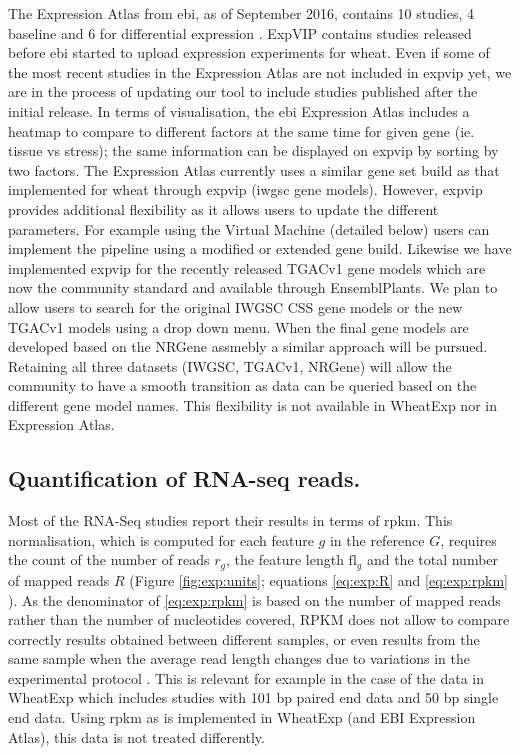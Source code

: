 The Expression Atlas from \gls{ebi}, as of September 2016, contains 10 studies, 4 baseline and 6 for differential expression \citep{Petryszak2016}. 
ExpVIP contains studies released before \acrshort{ebi} started to upload expression experiments for wheat. 
Even if some of the most recent studies in the Expression Atlas are not included in \gls{expvip} yet, we are in the process of updating our tool to include studies published after the initial release.
In terms of visualisation, the \gls{ebi} Expression Atlas includes a heatmap to compare to different factors at the same time for given gene (ie. tissue vs stress); the same information can be displayed on \gls{expvip} by sorting by two factors.
The Expression Atlas currently uses a similar gene set build as that implemented for wheat through \gls{expvip} (\acrshort{iwgsc} gene models). 
However, \gls{expvip} provides additional flexibility as it allows users to update the different parameters. 
For example using the Virtual Machine (detailed below) users can implement the pipeline using a modified or extended gene build. 
Likewise we have implemented \gls{expvip} for the recently released TGACv1 gene models which are now the community standard and available through EnsemblPlants. 
We plan to allow users to search for the original IWGSC CSS gene models or the new TGACv1 models using a drop down menu. 
When the final gene models are developed based on the NRGene assmebly a similar approach will be pursued. 
Retaining all three datasets (IWGSC, TGACv1, NRGene) will allow the community to have a smooth transition as data can be queried based on the different gene model names. 
This flexibility is not available in WheatExp nor in Expression Atlas. 

\subsection{Quantification of RNA-seq reads.}
Most of the RNA-Seq studies report their results in terms of \gls{rpkm}. 
This normalisation, which is computed for each feature $g$ in the reference $G$, requires the count of the number of reads  $r_{g}$, the feature length $\textrm{fl}_{g}$ and the total number of mapped reads $R$ (Figure \ref{fig:exp:units}; equations \ref{eq:exp:R} and  \ref{eq:exp:rpkm} \citealt{Mortazavi2008}).
As the denominator of \ref{eq:exp:rpkm} is based on the number of mapped reads rather than the number of nucleotides covered, RPKM does not allow to compare correctly results obtained between different samples, or even results from the same sample when the average read length changes due to variations in the experimental protocol \citealt{Wagner2012}.
This is relevant for example in the case of the data in WheatExp which includes studies with 101 bp paired end data and 50 bp single end data. 
Using \gls{rpkm} as is implemented in WheatExp (and EBI Expression Atlas), this data is not treated differently.  

